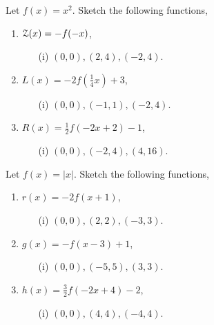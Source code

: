 \documentclass[12pt]{article} %
\begin{document}
\begin{qstn}
  Let $f(x) = x^2$. Sketch the following functions,
  \begin{enumerate}[label=(\alph*)]
    \item $\EuScript{Z}(x) = -f(-x)$,
      \begin{enumerate}
        \item [(i)] $(0,0), (2,4), (-2,4)$.
      \end{enumerate}
    \item $L(x) = -2f(\frac{1}{4}x) + 3$,
      \begin{enumerate}
        \item [(i)] $(0,0), (-1,1), (-2,4)$.
      \end{enumerate}
    \item $R(x) = \frac{1}{2}f(-2x + 2) - 1$, 
      \begin{enumerate}
        \item [(i)] $(0,0), (-2,4), (4,16)$.
      \end{enumerate}
  \end{enumerate}
\end{qstn}

\begin{qstn}
  Let $f(x) = \left|x\right|$. Sketch the following functions,
  \begin{enumerate}[label=(\alph*)]
    \item $r(x) = -2f(x + 1)$, 
      \begin{enumerate}
        \item [(i)] $(0,0), (2,2), (-3,3)$.
      \end{enumerate}
    \item $g(x) = -f(x - 3) + 1$, 
      \begin{enumerate}
        \item [(i)] $(0,0), (-5,5), (3,3)$.
      \end{enumerate}
    \item $h(x) = \frac{3}{2}f(-2x + 4) - 2$,
      \begin{enumerate}
        \item [(i)] $(0,0), (4,4), (-4,4)$.
      \end{enumerate}
  \end{enumerate}
\end{qstn}
\end{document}

